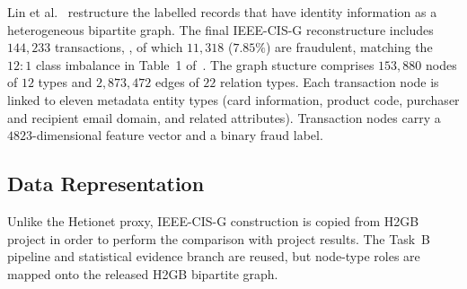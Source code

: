 Lin et al.~\cite{lin2025h2gb} restructure the labelled records that have identity information as 
a heterogeneous bipartite graph.
The final IEEE-CIS-G reconstructure includes $144{,}233$ transactions, , of 
which $11{,}318$ ($7.85\%$) are fraudulent, matching the $12{:}1$ class imbalance in 
Table~1 of~\cite{lin2025h2gb}.
The graph stucture 
 comprises $153{,}880$ nodes of $12$ types and $2{,}873{,}472$ edges of $22$ relation types.
Each transaction node is linked to eleven metadata entity types (card information, product code, 
purchaser and recipient email domain, and related attributes).
Transaction nodes carry a $4823$-dimensional feature vector and a binary fraud label.

\subsection{Data Representation}
\label{sec:ieee-data}

Unlike the Hetionet proxy, IEEE-CIS-G construction is copied from H2GB project in order
to perform the comparison with project results. 
The Task~B pipeline and statistical evidence branch are reused, but node-type
roles are mapped onto the released H2GB bipartite graph. 

